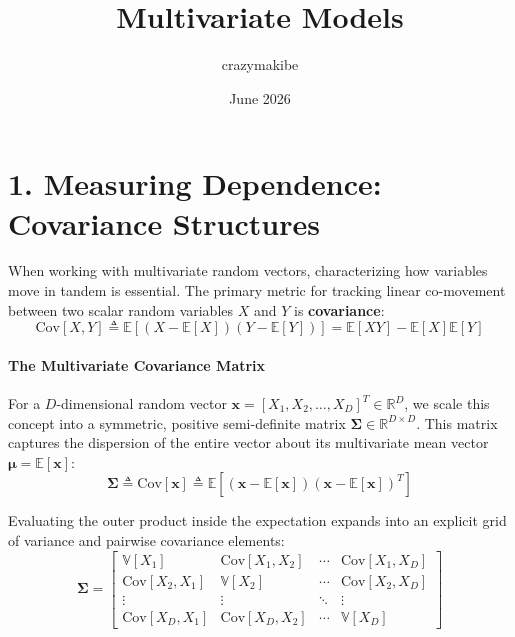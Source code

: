 \documentclass{article}
\title{Multivariate Models}
\author{crazymakibe}
\date{June 2026}
\begin{document}
\section*{1. Measuring Dependence: Covariance Structures}

When working with multivariate random vectors, characterizing how variables move in tandem is essential. The primary metric for tracking linear co-movement between two scalar random variables $X$ and $Y$ is \textbf{covariance}:
\begin{equation}
\text{Cov}[X, Y] \triangleq \mathbb{E}\left[(X - \mathbb{E}[X])(Y - \mathbb{E}[Y])\right] = \mathbb{E}[XY] - \mathbb{E}[X]\mathbb{E}[Y] \tag{1}
\end{equation}

\paragraph{The Multivariate Covariance Matrix}
For a $D$-dimensional random vector $\mathbf{x} = [X_1, X_2, \dots, X_D]^T \in \mathbb{R}^D$, we scale this concept into a symmetric, positive semi-definite matrix $\boldsymbol{\Sigma} \in \mathbb{R}^{D \times D}$. This matrix captures the dispersion of the entire vector about its multivariate mean vector $\boldsymbol{\mu} = \mathbb{E}[\mathbf{x}]$:
\begin{equation}
\boldsymbol{\Sigma} \triangleq \text{Cov}[\mathbf{x}] \triangleq \mathbb{E}\left[ (\mathbf{x} - \mathbb{E}[\mathbf{x}])(\mathbf{x} - \mathbb{E}[\mathbf{x}])^T \right] \tag{2}
\end{equation}

Evaluating the outer product inside the expectation expands into an explicit grid of variance and pairwise covariance elements:
\begin{equation}
\boldsymbol{\Sigma} = 
\begin{bmatrix}
\mathbb{V}[X_1] & \text{Cov}[X_1, X_2] & \cdots & \text{Cov}[X_1, X_D] \\
\text{Cov}[X_2, X_1] & \mathbb{V}[X_2] & \cdots & \text{Cov}[X_2, X_D] \\
\vdots & \vdots & \ddots & \vdots \\
\text{Cov}[X_D, X_1] & \text{Cov}[X_D, X_2] & \cdots & \mathbb{V}[X_D]
\end{bmatrix} \tag{3}
\end{equation}
\end{document}

